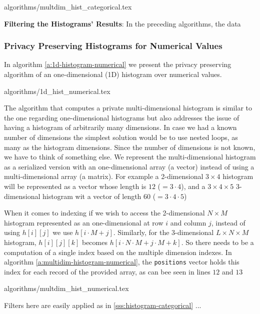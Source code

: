 {algorithms/multdim_hist_categorical.tex}


\textbf{Filtering the Histograms' Results}: In the preceding algorithms, the data 




\subsubsection{Privacy Preserving Histograms for Numerical Values}\label{sss:histogram-numerical}

In algorithm \ref{a:1d-histogram-numerical} we present the privacy preserving algorithm of an one-dimensional (1D) histogram over numerical values.


{algorithms/1d_hist_numerical.tex}




The algorithm that computes a private multi-dimensional histogram is similar to the one regarding one-dimensional histograms but also addresses the issue of having a histogram of arbitrarily many dimensions.
In case we had a known number of dimensions the simplest solution would be to use nested loops, as many as the histogram dimensions.
Since the number of dimensions is not known, we have to think of something else.
We represent the multi-dimensional histogram as a serialized version with an one-dimensional array (a vector) instead of using a multi-dimensional array (a matrix).
For example a 2-dimensional $3 \times 4$ histogram will be represented as a vector whose length is $ 12 $ ($= 3 \cdot 4$), and a $3 \times 4 \times 5$ 3-dimensional histogram wit a vector of length $ 60 $ ($= 3 \cdot 4 \cdot 5$)

When it comes to indexing if we wish to access the 2-dimensional $N \times M$ histogram represented as an one-dimensional at row $ i $ and column $ j $, instead of using $h[i][j]$ we use $h[i \cdot M + j]$.
Similarly, for the 3-dimensional $L \times N \times M$ histogram, $h[i][j][k]$ becomes $h[i \cdot N \cdot M + j \cdot M + k]$. So there needs to be a computation of a single index based on the multiple dimension indexes. In algorithm \ref{a:multidim-histogram-numerical}, the \texttt{positions} vector holds this index for each record of the provided array, as can bee seen in lines $ 12 $ and $ 13 $

{algorithms/multdim_hist_numerical.tex}


Filters here are easily applied as in \ref{sss:histogram-categorical} ... 


